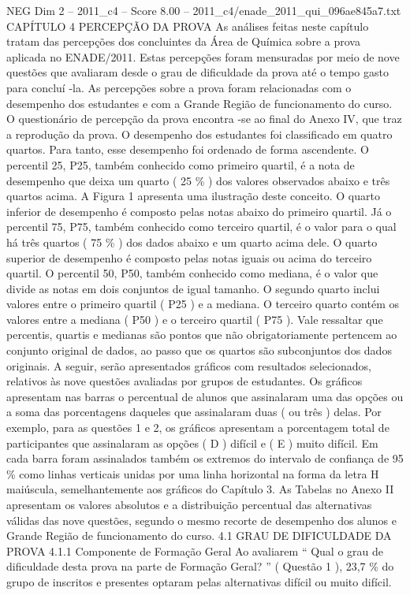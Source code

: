 \begin{textsample}{NEG Dim 2 – 2011\_c4 – Score 8.00 – 2011\_c4/enade\_2011\_qui\_096ae845a7.txt}  \label{ex:f2_neg_306}
CAPÍTULO 4 PERCEPÇÃO DA PROVA As análises feitas neste capítulo tratam das percepções dos concluintes da Área de Química sobre a prova aplicada no ENADE/2011.
Estas percepções foram mensuradas por meio de nove questões que avaliaram desde o grau de dificuldade da prova até o tempo gasto para concluí -la.
As percepções sobre a prova foram relacionadas com o desempenho dos estudantes e com a Grande Região de funcionamento do curso.
O questionário de percepção da prova encontra -se ao final do Anexo IV, que traz a reprodução da prova.
O desempenho dos estudantes foi classificado em quatro quartos.
Para tanto, esse desempenho foi ordenado de forma ascendente.
O percentil 25, P25, também conhecido como primeiro quartil, é a nota de desempenho que deixa um quarto ( 25 \% ) dos valores observados abaixo e três quartos acima.
A Figura 1 apresenta uma ilustração deste conceito.
O quarto inferior de desempenho é composto pelas notas abaixo do primeiro quartil.
Já o percentil 75, P75, também conhecido como terceiro quartil, é o valor para o qual há três quartos ( 75 \% ) dos dados abaixo e um quarto acima dele.
O quarto superior de desempenho é composto pelas notas iguais ou acima do terceiro quartil.
O percentil 50, P50, também conhecido como mediana, é o valor que divide as notas em dois conjuntos de igual tamanho.
O segundo quarto inclui valores entre o primeiro quartil ( P25 ) e a mediana.
O terceiro quarto contém os valores entre a mediana ( P50 ) e o terceiro quartil ( P75 ).
Vale ressaltar que percentis, quartis e medianas são pontos que não obrigatoriamente pertencem ao conjunto original de dados, ao passo que os quartos são subconjuntos dos dados originais.
A seguir, serão apresentados gráficos com resultados selecionados, relativos às nove questões avaliadas por grupos de estudantes.
Os gráficos apresentam nas barras o percentual de alunos que assinalaram uma das opções ou a soma das porcentagens daqueles que assinalaram duas ( ou três ) delas.
Por exemplo, para as questões 1 e 2, os gráficos apresentam a porcentagem total de participantes que assinalaram as opções ( D ) difícil e ( E ) muito difícil.
Em cada barra foram assinalados também os extremos do intervalo de confiança de 95 \% como linhas verticais unidas por uma linha horizontal na forma da letra H maiúscula, semelhantemente aos gráficos do Capítulo 3.
As Tabelas no Anexo II apresentam os valores absolutos e a distribuição percentual das alternativas válidas das nove questões, segundo o mesmo recorte de desempenho dos alunos e Grande Região de funcionamento do curso. 4.1 GRAU DE DIFICULDADE DA PROVA 4.1.1 Componente de Formação Geral Ao avaliarem “ Qual o grau de dificuldade desta prova na parte de Formação Geral? ” ( Questão 1 ), 23,7 \% do grupo de inscritos e presentes optaram pelas alternativas difícil ou muito difícil.

\end{textsample}
